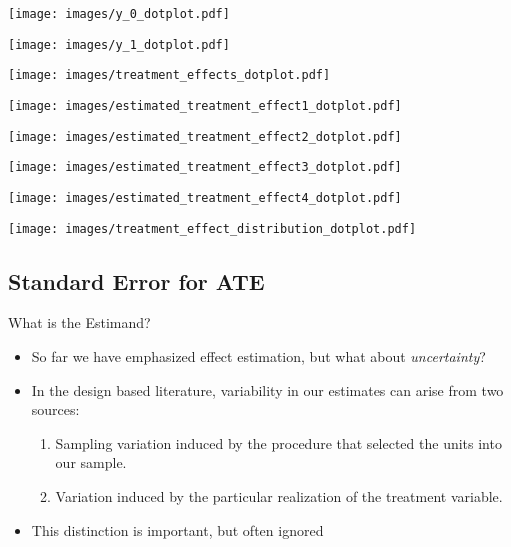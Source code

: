 \documentclass{beamer}
\numberwithin{equation}{section}
\begin{document}
\begin{frame}
\centering
\texttt{[image: images/y\_0\_dotplot.pdf]}
\end{frame}

\begin{frame}
\centering
\texttt{[image: images/y\_1\_dotplot.pdf]}
\end{frame}

\begin{frame}
\centering
\texttt{[image: images/treatment\_effects\_dotplot.pdf]}
\end{frame}

\begin{frame}
\centering
\texttt{[image: images/estimated\_treatment\_effect1\_dotplot.pdf]}
\end{frame}

\begin{frame}
\centering
\texttt{[image: images/estimated\_treatment\_effect2\_dotplot.pdf]}
\end{frame}

\begin{frame}
\centering
\texttt{[image: images/estimated\_treatment\_effect3\_dotplot.pdf]}
\end{frame}

\begin{frame}
\centering
\texttt{[image: images/estimated\_treatment\_effect4\_dotplot.pdf]}
\end{frame}

\begin{frame}
\centering
\texttt{[image: images/treatment\_effect\_distribution\_dotplot.pdf]}
\end{frame}

\subsection{Standard Error for ATE}

\begin{frame}{What is the Estimand?}

\begin{itemize}
\item  So far we have emphasized effect estimation, but what about
  \emph{uncertainty}?\bigskip
\item In the design based literature, variability in our estimates can arise
  from two sources:\bigskip
  \begin{enumerate}
  \def\labelenumi{\arabic{enumi}.}
  \itemsep1pt\parskip0pt
  \item
    Sampling variation induced by the procedure that selected the units
    into our sample. \bigskip 
  \item
    Variation induced by the particular realization of the treatment
    variable.\bigskip
  \end{enumerate}
\item
  This distinction is important, but often ignored 
\end{itemize}

\end{frame}
\end{document}
